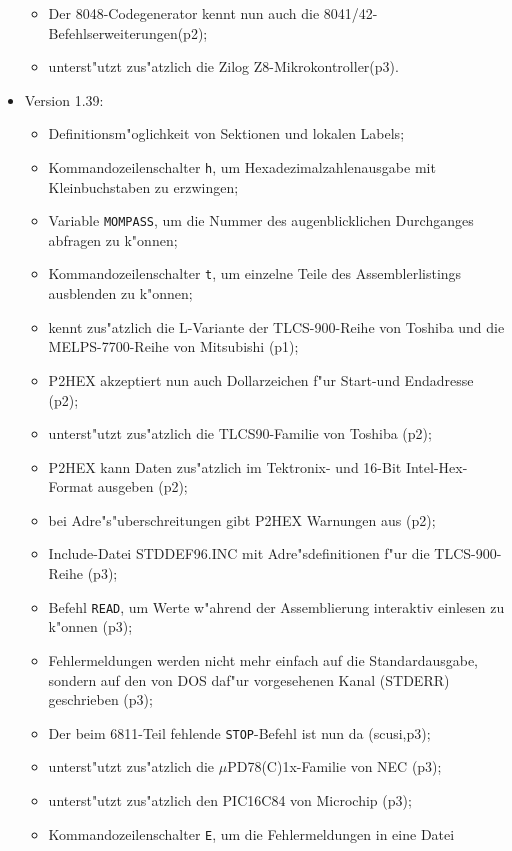 \documentclass[12pt,a4paper,twoside]{report}
\newcommand{\tty}[1]{{\tt #1}}
\begin{document}
\begin{itemize}
{\begin{itemize}
      \item{Der 8048-Codegenerator kennt nun auch die 8041/42-
            Befehlserweiterungen(p2);}
      \item{unterst"utzt zus"atzlich die Zilog Z8-Mikrokontroller(p3).}
      \end{itemize}}
\item{Version 1.39:
      \begin{itemize}
      \item{Definitionsm"oglichkeit von Sektionen und lokalen Labels;}
      \item{Kommandozeilenschalter \tty{h}, um Hexadezimalzahlenausgabe mit
            Kleinbuchstaben zu erzwingen;}
      \item{Variable \tty{MOMPASS}, um die Nummer des augenblicklichen Durchganges
            abfragen zu k"onnen;}
      \item{Kommandozeilenschalter \tty{t}, um einzelne Teile des Assemblerlistings
            ausblenden zu k"onnen;}
      \item{kennt zus"atzlich die L-Variante der TLCS-900-Reihe von Toshiba
            und die MELPS-7700-Reihe von Mitsubishi (p1);}
      \item{P2HEX akzeptiert nun auch Dollarzeichen f"ur Start-und Endadresse
            (p2);}
      \item{unterst"utzt zus"atzlich die TLCS90-Familie von Toshiba (p2);}
      \item{P2HEX kann Daten zus"atzlich im Tektronix- und 16-Bit
            Intel-Hex-Format ausgeben (p2);}
      \item{bei Adre"s"uberschreitungen gibt P2HEX Warnungen aus (p2);}
      \item{Include-Datei STDDEF96.INC mit Adre"sdefinitionen f"ur die
            TLCS-900-Reihe (p3);}
      \item{Befehl \tty{READ}, um Werte w"ahrend der Assemblierung interaktiv
            einlesen zu k"onnen (p3);}
      \item{Fehlermeldungen werden nicht mehr einfach auf die
            Standardausgabe, sondern auf den von DOS daf"ur vorgesehenen
            Kanal (STDERR) geschrieben (p3);}
      \item{Der beim 6811-Teil fehlende \tty{STOP}-Befehl ist nun da (scusi,p3);}
      \item{unterst"utzt zus"atzlich die $\mu$PD78(C)1x-Familie von NEC (p3);}
      \item{unterst"utzt zus"atzlich den PIC16C84 von Microchip (p3);}
      \item{Kommandozeilenschalter \tty{E}, um die Fehlermeldungen in eine Datei
}
\end{itemize}}
\end{itemize}
\end{document}
